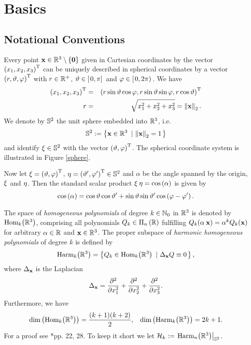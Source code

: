 \chapter{Basics}
\label{Basics}

\section{Notational Conventions}
\label{Basics:Notation}

Every point $\mathbf{x} \in \mathbb{R}^3 \setminus \left\{\mathbf{0}\right\rbrace$ given in Cartesian coordinates by the vector 
$\left(x_1,x_2,x_3\right)^{\text{\rm{T}}}$ can be uniquely described in spherical coordinates by a vector
$\left(r,\vartheta,\varphi\right)^{\text{\rm{T}}}$ with $r \in \mathbb{R}^{+}$, $\vartheta \in \left[\left.0,\pi\right]\right.$ and 
$\varphi \in \left[\left.0,2\pi\right)\right.$.
We have
\begin{eqnarray*}
  \left(x_1,x_2,x_3\right)^{\text{\rm{T}}} & = & \left(r \sin \vartheta \cos \varphi, r \sin \vartheta \sin \varphi, r \cos \vartheta\right)^{\text{\rm{T}}}\\
  r & = & \sqrt{x_1^2+x_2^2+x_3^2} = \left\|\mathbf{x}\right\|_2.
\end{eqnarray*} 
We denote by $\mathbb{S}^2$ the unit sphere embedded into $\mathbb{R}^3$, i.e. 
$$\mathbb{S}^2 := \left\{\mathbf{x} \in \mathbb{R}^{3}\ \left|\ \left\|\mathbf{x}\right\|_2=1\right.\right\rbrace$$ 
and identify $\mathbf{\xi} \in \mathbb{S}^2$ with the vector $\left(\vartheta,\varphi\right)^{\text{\rm{T}}}$. The 
spherical coordinate system is illustrated in Figure \ref{sphere}.

Now let $\mathbf{\xi} = \left(\vartheta,\varphi\right)^{\text{\rm{T}}}$, $\mathbf{\eta} = \left(\vartheta',\varphi'\right)^{\text{\rm{T}}} \in
\mathbb{S}^2$ and $\alpha$ be the angle spanned by the origin, $\mathbf{\xi}$ and $\mathbf{\eta}$.
Then the standard scalar product
$\mathbf{\xi} \: \mathbf{\eta} = \cos\left(\alpha\right)$ is given by
\begin{equation}
  \nonumber
  \cos{\hspace{-0.4ex}}\left(\alpha\right) = \cos\vartheta\cos\vartheta' +
  \sin\vartheta\sin\vartheta'\cos{\hspace{-0.4ex}}\left(\varphi-\varphi'\right).
\end{equation}

The space of \emph{homogeneous polynomials} of degree $k \in \mathbb{N}_{0}$ in $\mathbb{R}^3$ is denoted by
$\text{Hom}_k{\hspace{-0.4ex}}\left(\mathbb{R}^3\right)$, comprising all polynomials $Q_k \in \Pi_{n}\left(\mathbb{R}\right)$ fulfilling 
$Q_k{\hspace{-0.4ex}}\left(\alpha\:\mathbf{x}\right) = \alpha^k Q_k{\hspace{-0.4ex}}\left(\mathbf{x}\right)$ for arbitrary $\alpha \in \mathbb{R}$ and $\mathbf{x}
\in \mathbb{R}^3$. The proper subspace of \emph{harmonic homogeneous polynomials} of
degree $k$ is defined by
\begin{equation}
  \nonumber
  \text{Harm}_k{\hspace{-0.4ex}}\left(\mathbb{R}^3\right) = \left\{Q_k \in \text{Hom}_k{\hspace{-0.4ex}}\left(\mathbb{R}^3\right)\ \left|\ \Delta_{\mathbf{x}} Q \equiv 0\right.\right\rbrace,
\end{equation}
where $\Delta_{\mathbf{x}}$ is the Laplacian
\begin{equation}
  \nonumber
  \Delta_{\mathbf{x}} = \frac{\partial^2}{\partial x_1^2} + \frac{\partial^2}{\partial x_2^2} +
  \frac{\partial^2}{\partial x_3^2}.
\end{equation}
Furthermore, we have
\begin{align}
  \nonumber
  \dim{\hspace{-0.4ex}}\left(\text{Hom}_k{\hspace{-0.4ex}}\left(\mathbb{R}^3\right)\right) & = \frac{(k+1)(k+2)}{2}, & 
  \dim{\hspace{-0.4ex}}\left(\text{Harm}_k{\hspace{-0.4ex}}\left(\mathbb{R}^3\right)\right) = 2k+1.
\end{align}
For a proof see \cite{freeden}*{pp. 22, 28}. To keep it short we let $\mathcal{H}_k := \left.\text{Harm}_n{\hspace{-0.4ex}}\left(\mathbb{R}^3\right)\right|_{\mathbb{S}^2}$.

